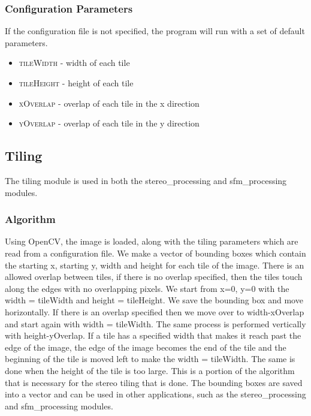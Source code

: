 \subsubsection{Configuration Parameters}
If the configuration file is not specified, the program will run with a set of default parameters.
\begin{itemize}
	\item{\textsc{tileWidth}} - width of each tile
	\item{\textsc{tileHeight}} - height of each tile
	\item{\textsc{xOverlap}} - overlap of each tile in the x direction
	\item{\textsc{yOverlap}} - overlap of each tile in the y direction
\end{itemize}


\subsection{Tiling}
The tiling module is used in both the stereo\_processing and sfm\_processing modules.
\subsubsection{Algorithm}
Using OpenCV, the image is loaded, along with the tiling parameters which are read from a configuration file. We make a vector of bounding boxes which contain the starting x, starting y, width and height for each tile of the image. There is an allowed overlap between tiles, if there is no overlap specified, then the tiles touch along the edges with no overlapping pixels. We start from x=0, y=0 with the width = tileWidth and height = tileHeight. We save the bounding box and move horizontally. If there is an overlap specified then we move over to width-xOverlap and start again with width = tileWidth. The same process is performed vertically with height-yOverlap. If a tile has a specified width that makes it reach past the edge of the image, the edge of the image becomes the end of the tile and the beginning of the tile is moved left to make the width = tileWidth. The same is done when the height of the tile is too large. This is a portion of the algorithm that is necessary for the stereo tiling that is done. The bounding boxes are saved into a vector and can be used in other applications, such as the stereo\_processing and sfm\_processing modules.









